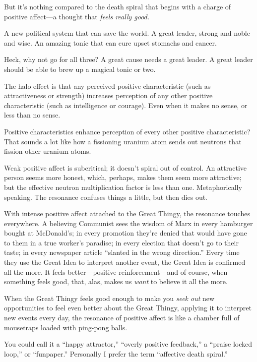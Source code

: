 {
 But it's nothing compared to the death spiral that
begins with a charge of positive affect---a thought that \textit{feels
really good.}}

{
 A new political system that can save the world. A great leader,
strong and noble and wise. An amazing tonic that can cure upset
stomachs and cancer.}

{
 Heck, why not go for all three? A great cause needs a great
leader. A great leader should be able to brew up a magical tonic or
two.}

{
 The halo effect is that any perceived positive characteristic
(such as attractiveness or strength) increases perception of any other
positive characteristic (such as intelligence or courage). Even when it
makes no sense, or less than no sense.}

{
 Positive characteristics enhance perception of every other
positive characteristic? That sounds a lot like how a fissioning
uranium atom sends out neutrons that fission other uranium atoms.}

{
 Weak positive affect is subcritical; it doesn't
spiral out of control. An attractive person seems more honest, which,
perhaps, makes them seem more attractive; but the effective neutron
multiplication factor is less than one. Metaphorically speaking. The
resonance confuses things a little, but then dies out.}

{
 With intense positive affect attached to the Great Thingy, the
resonance touches everywhere. A believing Communist sees the wisdom of
Marx in every hamburger bought at McDonald's; in every
promotion they're denied that would have gone to them
in a true worker's paradise; in every election that
doesn't go to their taste; in every newspaper article
``slanted in the wrong direction.''
Every time they use the Great Idea to interpret another event, the
Great Idea is confirmed all the more. It feels better---positive
reinforcement---and of course, when something feels good, that, alas,
makes us \textit{want} to believe it all the more.}

{
 When the Great Thingy feels good enough to make you \textit{seek
out} new opportunities to feel even better about the Great Thingy,
applying it to interpret new events every day, the resonance of
positive affect is like a chamber full of mousetraps loaded with
ping-pong balls.}

{
 You could call it a ``happy
attractor,'' ``overly positive
feedback,'' a ``praise locked
loop,'' or
``funpaper.'' Personally I prefer
the term ``affective death
spiral.''}

